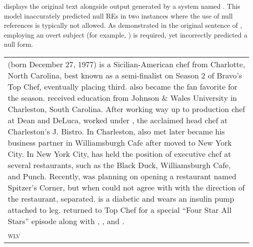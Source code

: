  displays the original text alongside output generated by a system named  \citep{orasan-dornescu-2009-wlv}. This model inaccurately predicted null REs in two instances where the use of null references is typically not allowed. As demonstrated in the original sentence of , employing an overt subject (for example, ) is required, yet  incorrectly predicted a null form.

\begin{table}
		\begin{tabularx}{\textwidth}{ Q }
			\lsptoprule
			 \\\midrule
			 (born December 27, 1977) is a Sicilian-American chef from Charlotte, North Carolina, best known as a semi-finalist on Season 2 of Bravo's Top Chef, eventually placing third.  also became the fan favorite for the season.  received  education from Johnson \& Wales University in Charleston, South Carolina. After working  way up to production chef at Dean and DeLuca,  worked under , the acclaimed head chef at Charleston’s J. Bistro. In Charleston,  also met   later became his business partner in Williamsburgh Cafe after  moved to New York City. In New York City,  has held the position of executive chef at several restaurants, such as the Black Duck, Williamsburgh Cafe, and Punch. Recently,  was planning on opening a restaurant named Spitzer's Corner, but when  could not agree with  with the direction of the restaurant,  separated.  is a diabetic and \italunder{-} wears an insulin pump attached to  leg.  returned to Top Chef for a special “Four Star All Stars” episode along with , , and .\\\midrule
			\textsc{wlv} \\ \midrule

\end{tabularx}
\end{table}
